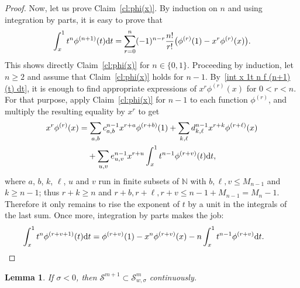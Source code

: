 \documentclass[pdftex]{sigma}
\newtheorem{Lemma}[Theorem]{Lemma}
\newcommand{\N}{\mathbb{N}}
\renewcommand{\SS}{\mathcal{S}}
\begin{document}
\begin{proof}
  Now, let us prove Claim~\ref{cl:phi(x)}. By induction on $n$ and using integration by parts, it is easy to prove that
    \begin{gather}\label{int x 1t n f (n+1)(t) dt}
      \int_x^1t^n\phi^{(n+1)}(t){\rm d}t=\sum_{r=0}^n(-1)^{n-r} \frac{n!}{r!} \bigl(\phi^{(r)}(1)-x^r\phi^{(r)}(x)\bigr) .
      \end{gather}
  This shows directly Claim~\ref{cl:phi(x)} for $n\in\{0,1\}$. Proceeding by induction, let $n\ge2$ and assume that Claim~\ref{cl:phi(x)} holds for $n-1$. By~\eqref{int x 1t n f (n+1)(t) dt}, it is enough to f\/ind appropriate expressions of $x^r\phi^{(r)}(x)$ for $0<r<n$. For that purpose, apply Claim~\ref{cl:phi(x)} for $n-1$ to each function $\phi^{(r)}$, and multiply the resulting equality by $x^r$ to get
    \begin{gather*}
    \begin{split}
    &  x^r\phi^{(r)}(x)=\sum_{a,b}c^{n-1}_{a,b}x^{r+a}\phi^{(r+b)}(1)+\sum_{k,\ell}d^{n-1}_{k,\ell}x^{r+k}\phi^{(r+\ell)}(x)\\
& \hphantom{x^r\phi^{(r)}(x)=}{}+\sum_{u,v}e^{n-1}_{u,v}x^{r+u}\int_x^1t^{n-1}\phi^{(r+v)}(t){\rm d}t ,
\end{split}
    \end{gather*}
  where $a$, $b$, $k$, $\ell$, $u$ and $v$ run in f\/inite subsets of $\N$ with $b,\ell,v\le M_{n-1}$ and $k\ge n-1$; thus $r+k\ge n$ and $r+b,r+\ell,r+v\le n-1+M_{n-1}=M_n-1$. Therefore it only remains to rise the exponent of $t$ by a unit in the integrals of the last sum. Once more, integration by parts makes the job:
    \begin{gather*}
      \int_x^1t^n\phi^{(r+v+1)}(t){\rm d}t=\phi^{(r+v)}(1)-x^n\phi^{(r+v)}(x)-n\int_x^1t^{n-1}\phi^{(r+v)}{\rm d}t .\tag*{\qed}
    \end{gather*}
\renewcommand{\qed}{}
\end{proof}

\begin{Lemma}\label{l:SS m+1 subset SS w,sigma m}
  If $\sigma<0$, then $\SS^{m+1}\subset\SS_{w,\sigma}^m$ continuously.
\end{Lemma}
\end{document}
